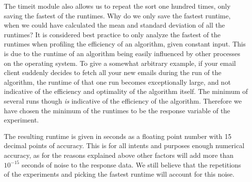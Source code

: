 The timeit module also allows us to repeat the sort one hundred times, only saving the fastest of the runtimes. Why do we only save the fastest runtime, when we could have calculated the mean and standard deviation of all the runtimes? It is considered best practice to only analyze the fastest of the runtimes when profiling the efficiency of an algorithm, given constant input. This is due to the runtime of an algorithm being easily influenced by other processes on the operating system. To give a somewhat arbitrary example, if your email client suddenly decides to fetch all your new emails during the run of the algorithm, the runtime of that one run becomes exceptionally large, and not indicative of the efficiency and optimality of the algorithm itself. The minimum of several runs though \textit{is} indicative of the efficiency of the algorithm. Therefore we have chosen the minimum of the runtimes to be the response variable of the experiment.

The resulting runtime is given in seconds as a floating point number with 15 decimal points of accuracy. This is for all intents and purposes enough numerical accuracy, as for the reasons explained above other factors will add more than $10^{-15}$ seconds of noise to the response data. We still believe that the repetitions of the experiments and picking the fastest runtime will account for this noise.